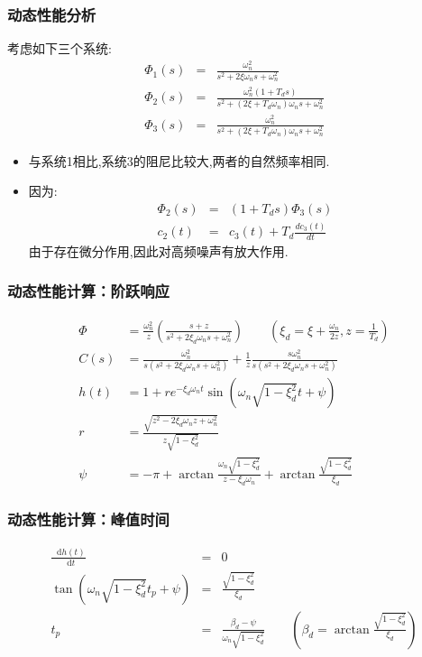 \documentclass{article}
\newcommand*\diff{\mathop{}\!\mathrm{d}}
\begin{document}
\begin{frame}
\frametitle{动态性能分析}
\label{sec-4-2-3}

考虑如下三个系统:
\begin{eqnarray*}
\Phi_1(s) &=&\frac{\omega_n^2}{s^2+2\xi\omega_n s+\omega_n^2}\\
\Phi_2(s) &=&\frac{\omega_n^2(1+T_d s) }{s^2+(2\xi+T_d\omega_n)\omega_n s+\omega_n^2}\\
\Phi_3(s) &=&\frac{\omega_n^2}{s^2+(2\xi+T_d\omega_n)\omega_n s+\omega_n^2}
\end{eqnarray*}           

\begin{itemize}
\item <2->与系统1相比,系统3的阻尼比较大,两者的自然频率相同.
\item <3->因为:
        \begin{eqnarray*}
        \Phi_2(s) & = & (1+T_d s)\Phi_3(s) \\
        c_2(t) &=& c_3(t)+T_d\frac{dc_3(t)}{dt}
        \end{eqnarray*}
       由于存在微分作用,因此对高频噪声有放大作用.
\end{itemize}
\end{frame}
\begin{frame}
\frametitle{动态性能计算：阶跃响应}
\label{sec-4-2-4}

\begin{align*}
\Phi &=  \frac{\omega_n^2}{z}\left(\frac{s+z}{s^2+2\xi_d\omega_n s+\omega_n^2}\right)\qquad (\xi_d=\xi+\frac{\omega_n}{2z},z=\frac{1}{T_d})\\
C(s) &= \frac{\omega_n^2}{s(s^2+2\xi_d\omega_n s+\omega_n^2)}+\frac{1}{z}\frac{s\omega_n^2}{s(s^2+2\xi_d\omega_n s+\omega_n^2)}\\
h(t) &= 1+re^{-\xi_d\omega_n t}\sin(\omega_n\sqrt{1-\xi_d^2}t+\psi) \\
r &= \frac{\sqrt{z^2-2\xi_d\omega_n z+\omega_n^2}}{z\sqrt{1-\xi_d^2}}\\
\psi &= -\pi+\arctan\frac{\omega_n\sqrt{1-\xi_d^2}}{z-\xi_d\omega_n}+\arctan \frac{\sqrt{1-\xi_d^2}}{\xi_d}
\end{align*}
\end{frame}
\begin{frame}
\frametitle{动态性能计算：峰值时间}
\label{sec-4-2-5}


\begin{eqnarray*}
\frac{\diff h(t)}{\diff t} & =& 0\\
\tan(\omega_n\sqrt{1-\xi_d^2}t_p+\psi) &=& \frac{\sqrt{1-\xi_d^2}}{\xi_d}\\
t_p &=& \frac{\beta_d-\psi}{\omega_n\sqrt{1-\xi_d^2}}\qquad \left(\beta_d=\arctan \frac{\sqrt{1-\xi_d^2}}{\xi_d}\right)\\
\end{eqnarray*}
\end{frame}
\end{document}
